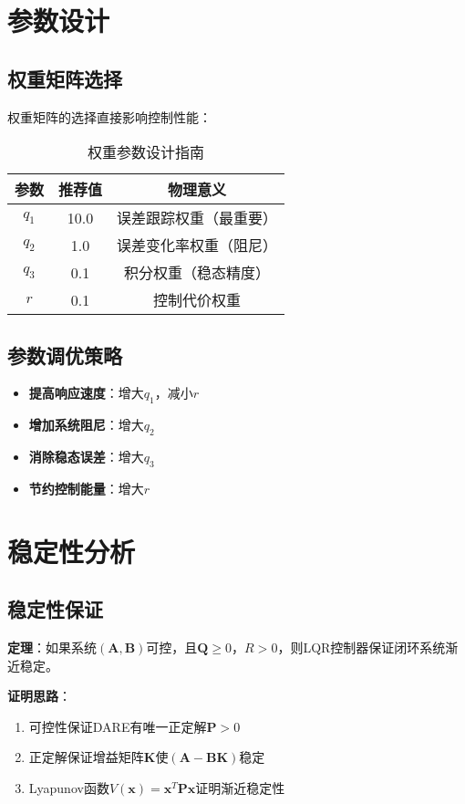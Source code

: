 \documentclass{article}
\begin{document}
\section{参数设计}

\subsection{权重矩阵选择}

权重矩阵的选择直接影响控制性能：

\begin{table}[h]
\centering
\caption{权重参数设计指南}
\begin{tabular}{|c|c|c|}
\hline
参数 & 推荐值 & 物理意义 \\
\hline
$q_1$ & 10.0 & 误差跟踪权重（最重要） \\
$q_2$ & 1.0 & 误差变化率权重（阻尼） \\
$q_3$ & 0.1 & 积分权重（稳态精度） \\
$r$ & 0.1 & 控制代价权重 \\
\hline
\end{tabular}
\end{table}

\subsection{参数调优策略}

\begin{itemize}
    \item \textbf{提高响应速度}：增大$q_1$，减小$r$
    \item \textbf{增加系统阻尼}：增大$q_2$
    \item \textbf{消除稳态误差}：增大$q_3$
    \item \textbf{节约控制能量}：增大$r$
\end{itemize}

\section{稳定性分析}

\subsection{稳定性保证}

\textbf{定理}：如果系统$(\mathbf{A}, \mathbf{B})$可控，且$\mathbf{Q} \geq 0$，$R > 0$，则LQR控制器保证闭环系统渐近稳定。

\textbf{证明思路}：
\begin{enumerate}
    \item 可控性保证DARE有唯一正定解$\mathbf{P} > 0$
    \item 正定解保证增益矩阵$\mathbf{K}$使$(\mathbf{A} - \mathbf{B}\mathbf{K})$稳定
    \item Lyapunov函数$V(\mathbf{x}) = \mathbf{x}^T\mathbf{P}\mathbf{x}$证明渐近稳定性
\end{enumerate}
\end{document}
